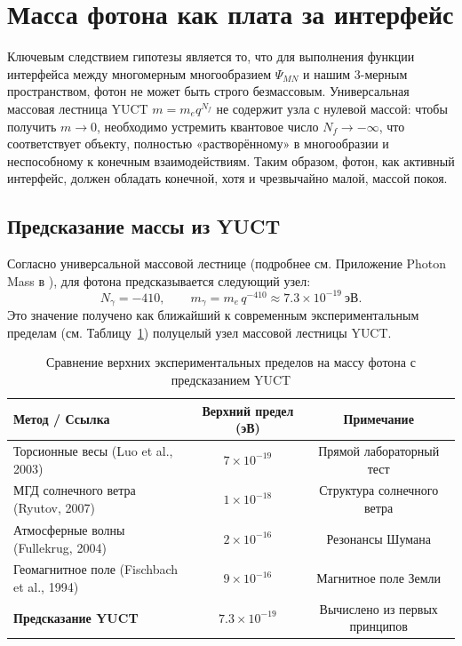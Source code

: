 \documentclass[11pt,a4paper]{article}
\begin{document}
	\section{Масса фотона как плата за интерфейс}
	\label{sec:photon_mass}
	
	Ключевым следствием гипотезы является то, что для выполнения функции интерфейса между многомерным многообразием $\Psi_{MN}$ и нашим 3-мерным пространством, фотон не может быть строго безмассовым. Универсальная массовая лестница YUCT $m = m_e q^{N_f}$ не содержит узла с нулевой массой: чтобы получить $m \to 0$, необходимо устремить квантовое число $N_f \to -\infty$, что соответствует объекту, полностью «растворённому» в многообразии и неспособному к конечным взаимодействиям. Таким образом, фотон, как активный интерфейс, должен обладать конечной, хотя и чрезвычайно малой, массой покоя.
	
	\subsection{Предсказание массы из YUCT}
	Согласно универсальной массовой лестнице (подробнее см. Приложение Photon Mass в \cite{yuct_zenodo}), для фотона предсказывается следующий узел:
	\begin{equation}
		\boxed{N_\gamma = -410}, \qquad
		\boxed{m_\gamma = m_e \, q^{-410} \approx 7.3 \times 10^{-19}~\text{эВ}} .
	\end{equation}
	Это значение получено как ближайший к современным экспериментальным пределам (см. Таблицу~\ref{tab:photon_limits}) полуцелый узел массовой лестницы YUCT.
	
	\begin{table}[h!]
		\centering
		\caption{Сравнение верхних экспериментальных пределов на массу фотона с предсказанием YUCT}
		\label{tab:photon_limits}
		\small
		\begin{tabular}{lcc}
			\toprule
			\textbf{Метод / Ссылка} & \textbf{Верхний предел (эВ)} & \textbf{Примечание} \\
			\midrule
			Торсионные весы (Luo et al., 2003) & $7\times10^{-19}$ & Прямой лабораторный тест \\
			МГД солнечного ветра (Ryutov, 2007) & $1\times10^{-18}$ & Структура солнечного ветра \\
			Атмосферные волны (Fullekrug, 2004) & $2\times10^{-16}$ & Резонансы Шумана \\
			Геомагнитное поле (Fischbach et al., 1994) & $9\times10^{-16}$ & Магнитное поле Земли \\
			\midrule
			\textbf{Предсказание YUCT} & \textbf{$7.3\times10^{-19}$} & Вычислено из первых принципов \\
			\bottomrule
		\end{tabular}
	\end{table}
	
\end{document}
